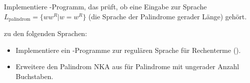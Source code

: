 \documentclass[10pt, a4paper]{scrartcl}
\begin{document}
\begin{aufgabe}[subtitle=Implementierung eines NKA: Palindrome]
\label{aufg:py-nka}
Implementiere -Programm, das prüft, ob eine Eingabe zur Sprache $L_\text{palindrom} = \{ ww^R | w = w^{R} \}$ (die Sprache der Palindrome gerader Länge) gehört.
\begin{center}
\begin{transitiongraph}[pa]
	
\end{transitiongraph}
\end{center}
\end{aufgabe}

\begin{aufgabe}[subtitle=Weitere Aufgaben,symbol=\symStern]
\label{aufg:py-weitere}
 zu den folgenden Sprachen:
\begin{itemize}
	\item Implementiere ein -Programme zur regulären Sprache für Rechenterme ().
	\item Erweitere den Palindrom NKA aus  für Palindrome mit ungerader Anzahl Buchstaben.
\end{itemize}
\end{aufgabe}
\end{document}
